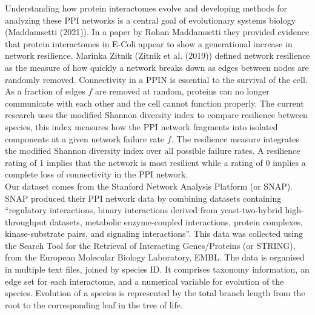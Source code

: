 \documentclass[12pt]{article}
\begin{document}
\indent Understanding how protein interactomes evolve and developing methods for analyzing these PPI networks is a central goal of evolutionary systems biology (Maddamsetti (2021)). In a paper by Rohan Maddamsetti they provided evidence that protein interactomes in E-Coli appear to show a generational increase in network resilience. Marinka Zitnik (Zitnik et al. (2019)) defined network resilience as the measure of how quickly a network breaks down as edges between nodes are randomly removed. Connectivity in a PPIN is essential to the survival of the cell. As a fraction of edges $f$ are removed at random, proteins can no longer communicate with each other and the cell cannot function properly. The current research uses the modified Shannon diversity index to compare resilience between species, this index measures how the PPI network fragments into isolated components at a given network failure rate $f$. The resilience measure integrates the modified Shannon diversity index over all possible failure rates. A resilience rating of 1 implies that the network is most resilient while a rating of 0 implies a complete loss of connectivity in the PPI network. \\
\indent Our dataset comes from the Stanford Network Analysis Platform (or SNAP). SNAP produced their PPI network data by combining datasets containing “regulatory interactions, binary interactions derived from yeast-two-hybrid high-throughput datasets, metabolic enzyme-coupled interactions, protein complexes, kinase-substrate pairs, and signaling interactions”. This data was collected using the Search Tool for the Retrieval of Interacting Genes/Proteins (or STRING), from the European Molecular Biology Laboratory, EMBL. The data is organised in multiple text files, joined by species ID. It comprises taxonomy information, an edge set for each interactome, and a numerical variable for evolution of the species. Evolution of a species is represented by the total branch length from the root to the corresponding leaf in the tree of life. \\
\end{document}
